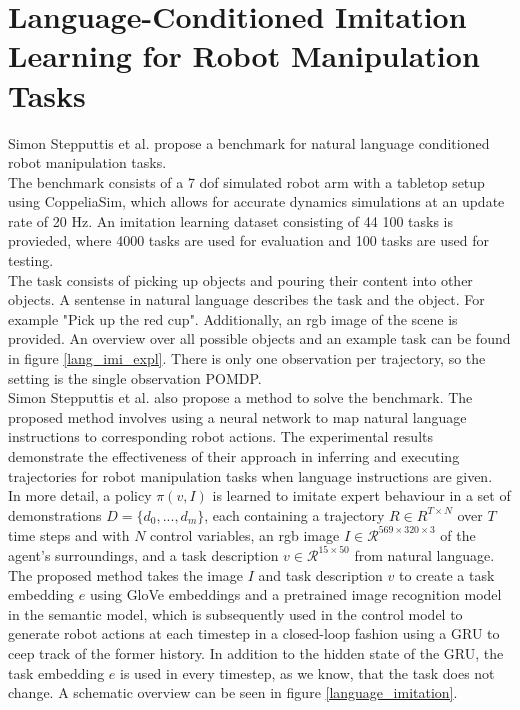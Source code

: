 \chapter{Language-Conditioned Imitation Learning for Robot Manipulation Tasks}
\label{LCILRM}
Simon Stepputtis et al. \cite{stepputtis2020languageconditioned} propose a benchmark for natural language conditioned robot manipulation tasks. \\
The benchmark consists of a 7 dof simulated robot arm with a 
tabletop setup using CoppeliaSim, which allows for accurate dynamics simulations at an update rate of 20 Hz. 
An imitation learning dataset consisting of 44 100 tasks is provieded, where 4000 tasks are used for 
evaluation and 100 tasks are used for testing.\\

The task consists of picking up objects and pouring their content into other objects. A sentense in natural language describes the task and the object. 
For example "Pick up the red cup". Additionally, an rgb image of the scene is provided. An overview over 
all possible objects and an example task can be found in figure \ref{lang_imi_expl}. 
There is only one observation per trajectory, so the setting is the single observation POMDP.  \\


Simon Stepputtis et al. \cite{stepputtis2020languageconditioned} also propose a method to solve the benchmark. 
The proposed method involves using a neural network to map natural language instructions to 
corresponding robot actions. The experimental results demonstrate the effectiveness of their approach in inferring and executing trajectories for robot manipulation 
tasks when language instructions are given. \\

In more detail, a policy $\pi(v,I)$ is learned to imitate expert behaviour in a set of demonstrations $D = \{d_0,...,d_m\}$, each containing a trajectory 
$R \in R^{T \times N}$ over $T$ time steps and with $N$ control variables, an rgb image $I \in \mathcal{R}^{569 \times 320 \times 3}$ of the agent's surroundings, 
and a task description $v \in \mathcal{R}^{15 \times 50}$ from natural language. The proposed method takes the image $I$ and task description $v$ 
to create a task embedding $e$ using GloVe embeddings and a pretrained image recognition model in the semantic model, 
which is subsequently used in the control model to generate robot actions at each timestep in a closed-loop 
fashion using a GRU to ceep track of the former history. In addition to the hidden state of the GRU, 
the task embedding $e$ is used in every timestep, as we know, that the task does not change. A schematic overview can be seen in figure \ref{language_imitation}. \\

